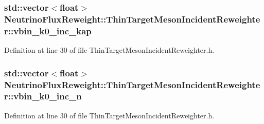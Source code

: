\hypertarget{class_neutrino_flux_reweight_1_1_thin_target_meson_incident_reweighter_af7170b60c8ca1d198bb17cbbacea10e6}{
\subsubsection[{vbin\-\_\-k0\-\_\-inc\-\_\-kap}]{\setlength{\rightskip}{0pt plus 5cm}std\-::vector$<$float$>$ Neutrino\-Flux\-Reweight\-::\-Thin\-Target\-Meson\-Incident\-Reweighter\-::vbin\-\_\-k0\-\_\-inc\-\_\-kap}}\label{class_neutrino_flux_reweight_1_1_thin_target_meson_incident_reweighter_af7170b60c8ca1d198bb17cbbacea10e6}


Definition at line 30 of file Thin\-Target\-Meson\-Incident\-Reweighter.\-h.

\hypertarget{class_neutrino_flux_reweight_1_1_thin_target_meson_incident_reweighter_a406b7314c117edd343d2d9418b48262f}{
\subsubsection[{vbin\-\_\-k0\-\_\-inc\-\_\-n}]{\setlength{\rightskip}{0pt plus 5cm}std\-::vector$<$float$>$ Neutrino\-Flux\-Reweight\-::\-Thin\-Target\-Meson\-Incident\-Reweighter\-::vbin\-\_\-k0\-\_\-inc\-\_\-n}}\label{class_neutrino_flux_reweight_1_1_thin_target_meson_incident_reweighter_a406b7314c117edd343d2d9418b48262f}


Definition at line 30 of file Thin\-Target\-Meson\-Incident\-Reweighter.\-h.

